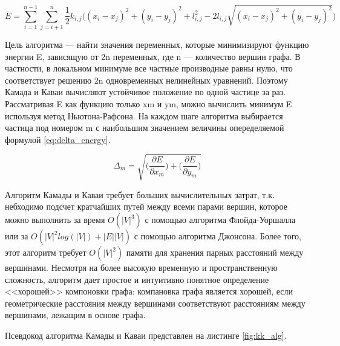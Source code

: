 \documentclass[14pt, russian]{scrartcl}
\begin{document}
\begin{equation}\label{eq:energy_extendet}
	E = \sum_{i = 1}^{n - 1}\sum_{j = i + 1}^{n}{\frac{1}{2}k_{i, j}\bigg( (x_i - x_j)^2 + (y_i - y_j)^2 + l^2_{i, j} - 2 l_{i, j}\sqrt{(x_i - x_j)^2 + (y_i - y_j)^2} \bigg)}
\end{equation}


Цель алгоритма --- найти значения переменных, которые минимизируют функцию энергии E, зависящую от 2n переменных, где n --- количество вершин графа. В частности, в локальном минимуме все частные производные равны нулю, что соответствует решению 2n одновременных нелинейных уравнений. Поэтому Камада и Каваи вычисляют устойчивое положение по одной частице за раз. Рассматривая E как функцию только xm и ym, можно вычислить минимум E используя метод Ньютона-Рафсона. На каждом шаге алгоритма выбирается частица под номером m с наибольшим значением величины опеределяемой формулой \ref{eq:delta_energy}.

\begin{equation}\label{eq:delta_energy}
	\Delta_m = \sqrt{\bigg( \frac{\partial E}{\partial x_m} \bigg) + \bigg(  \frac{\partial E}{\partial y_m} \bigg)}
\end{equation}

Алгоритм Камады и Каваи требует больших вычислительных затрат, т.к. небходимо подсчет кратчайших путей между всеми парами вершин, которое можно выполнить за время $O(|V|^3)$ с помощью алгоритма Флойда-Уоршалла или за $O(|V|^2 log(|V|)  + |E||V|)$ с помощью алгоритма Джонсона. Более того, этот алгоритм требует $O(|V|^2)$ памяти для хранения парных расстояний между вершинами. Несмотря на более высокую временную и пространственную сложность, алгоритм дает простое и интуитивно понятное определение <<хорошей>>
компоновки графа: компановка графа является хорошей, если геометрические расстояния между вершинами соответствуют расстояниям между вершинами, лежащим в основе графа.

Псевдокод алгоритма Камады и Каваи представлен на листинге \ref{fig:kk_alg}.
\end{document}
